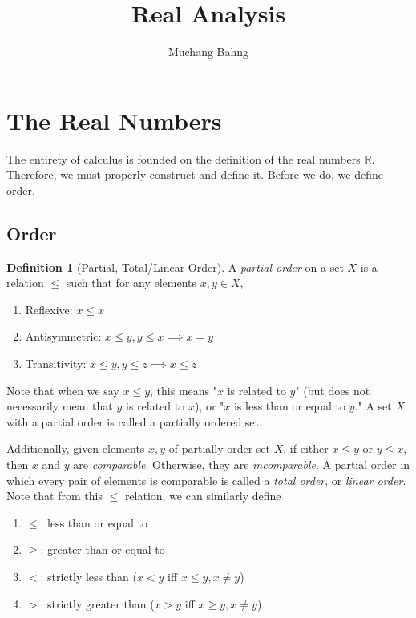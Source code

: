 \documentclass{article}
\theoremstyle{remark}
\theoremstyle{definition}
\newtheorem{definition}{Definition}[section]
\begin{document}
\pagestyle{fancy}

\cfoot{\thepage / \pageref{LastPage}}

\title{Real Analysis}
\author{Muchang Bahng}

\maketitle

\section{The Real Numbers}
The entirety of calculus is founded on the definition of the real numbers $\mathbb{R}$. Therefore, we must properly construct and define it. Before we do, we define order. 

\subsection{Order}
\begin{definition}[Partial, Total/Linear Order]
A \textit{partial order} on a set $X$ is a relation $\leq$ such that for any elements $x, y \in X$, 
\begin{enumerate}
    \item Reflexive: $x \leq x$ 
    \item Antisymmetric: $x \leq y, y \leq x \implies x = y$
    \item Transitivity: $x \leq y, y \leq z \implies x \leq z$
\end{enumerate}
Note that when we say $x \leq y$, this means "$x$ is related to $y$" (but does not necessarily mean that $y$ is related to $x$), or "$x$ is less than or equal to $y$." A set $X$ with a partial order is called a partially ordered set. 

Additionally, given elements $x, y$ of partially order set $X$, if either $x \leq y$ or $y \leq x$, then $x$ and $y$ are \textit{comparable}. Otherwise, they are \textit{incomparable}. A partial order in which every pair of elements is comparable is called a \textit{total order}, or \textit{linear order}. Note that from this $\leq$ relation, we can similarly define 
\begin{enumerate}
    \item $\leq$: less than or equal to 
    \item $\geq$: greater than or equal to 
    \item $<$: strictly less than ($x < y$ iff $x\leq y, x \neq y$)
    \item $>$: strictly greater than ($x > y$ iff $x \geq y, x \neq y$)
\end{enumerate}
\end{definition}
\end{document}
